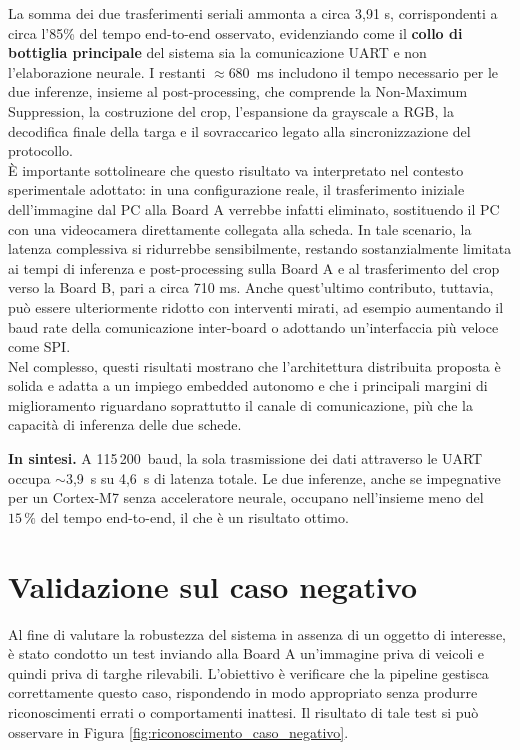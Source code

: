 La somma dei due trasferimenti seriali ammonta a circa 3,91 s, corrispondenti a circa l'85\% del tempo end-to-end osservato, evidenziando come il \textbf{collo di bottiglia principale} del sistema sia la comunicazione UART e non l'elaborazione neurale. I restanti $\approx680$~ms includono il tempo necessario per le due inferenze, insieme al post-processing, che comprende la Non-Maximum Suppression, la costruzione del crop, l'espansione da grayscale a RGB, la decodifica finale della targa e il sovraccarico legato alla sincronizzazione del protocollo.\\
È importante sottolineare che questo risultato va interpretato nel contesto sperimentale adottato: in una configurazione reale, il trasferimento iniziale dell'immagine dal PC alla Board A verrebbe infatti eliminato, sostituendo il PC con una videocamera direttamente collegata alla scheda. In tale scenario, la latenza complessiva si ridurrebbe sensibilmente, restando sostanzialmente limitata ai tempi di inferenza e post-processing sulla Board A e al trasferimento del crop verso la Board B, pari a circa 710 ms. Anche quest'ultimo contributo, tuttavia, può essere ulteriormente ridotto con interventi mirati, ad esempio aumentando il baud rate della comunicazione inter-board o adottando un'interfaccia più veloce come SPI.\\
Nel complesso, questi risultati mostrano che l'architettura distribuita proposta è solida e adatta a un impiego embedded autonomo e che i principali margini di miglioramento riguardano soprattutto il canale di comunicazione, più che la capacità di inferenza delle due schede.

\begin{boxH}
\textbf{In sintesi.} A 115\,200~baud, la sola trasmissione dei dati attraverso le UART occupa $\sim$3{,}9~s su 4{,}6~s di latenza totale. Le due inferenze, anche se impegnative per un Cortex-M7 senza acceleratore neurale, occupano nell'insieme meno del $15\,\%$ del tempo end-to-end, il che è un risultato ottimo.
\end{boxH}

\section{Validazione sul caso negativo}
Al fine di valutare la robustezza del sistema in assenza di un oggetto di interesse, è stato condotto un test inviando alla Board A un'immagine priva di veicoli e quindi priva di targhe rilevabili. L'obiettivo è verificare che la pipeline gestisca correttamente questo caso, rispondendo in modo appropriato senza produrre riconoscimenti errati o comportamenti inattesi. Il risultato di tale test si può osservare in Figura \ref{fig:riconoscimento_caso_negativo}.

